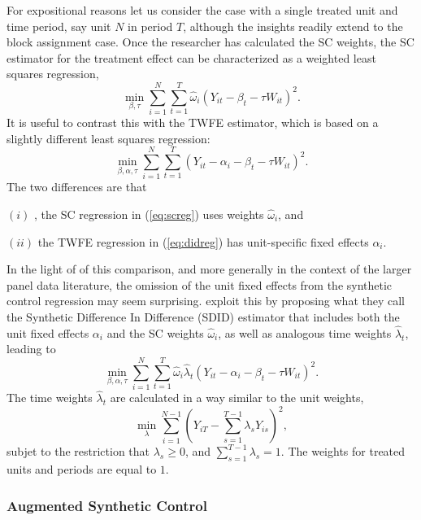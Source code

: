 \documentclass[letterpaper,12pt,leqno]{article}
\begin{document}
For expositional reasons let us consider the case with a single treated unit and time period, say unit $N$ in period $T$, although the insights readily extend to the block assignment case.
Once the researcher has calculated the SC weights, the SC estimator for the treatment effect can be characterized as a weighted least squares regression,
\begin{equation}\label{eq:screg} \min_{\beta,\tau}\sum_{i=1}^N\sum_{t=1}^T \hat\omega_i\left(Y_{it}-\beta_t-\tau W_{it}\right)^2.\end{equation}
It is useful to contrast this with the TWFE estimator, which is based on a slightly different least squares regression:
\begin{equation}\label{eq:didreg}  \min_{\beta,\alpha,\tau}\sum_{i=1}^N\sum_{t=1}^T \left(Y_{it}-\alpha_i-\beta_t-\tau W_{it}\right)^2.\end{equation}
The two differences are that  \begin{inparadesc}\item[$(i)$], the SC regression in (\ref{eq:screg}) uses weights $\hat\omega_i$, and \item[$(ii)$] the TWFE regression in (\ref{eq:didreg}) has unit-specific fixed effects $\alpha_i$.
\end{inparadesc}

In the light of
of this comparison, and more generally in the context of the larger panel data literature, the omission of the unit fixed effects from the synthetic control regression may seem surprising. 
\citep*{arkhangelsky2021synthetic} exploit this  by proposing what they call the Synthetic Difference In Difference (SDID) estimator that includes both the unit fixed effects $\alpha_i$ and the SC weights $\hat\omega_i$, as well as analogous time weights $\hat\lambda_t$, leading to 
\[ \min_{\beta,\alpha,\tau}
\sum_{i=1}^N\sum_{t=1}^T \hat\omega_i\hat\lambda_t\left(Y_{it}-\alpha_i-\beta_t-\tau W_{it}\right)^2.\]
 The time weights $\hat\lambda_t$ are calculated in a way similar to the unit weights,
\[ \min_\lambda \sum_{i=1}^{N-1}
\left( Y_{iT}-\sum_{s=1}^{T-1}\lambda_s Y_{is}\right)^2,\]
subjet to the restriction that $\lambda_s\geq 0$, and $\sum_{s=1}^{T-1} \lambda_s=1$. The weights for treated units and periods are equal to $1$.

\subsubsection{Augmented Synthetic Control}
\end{document}
